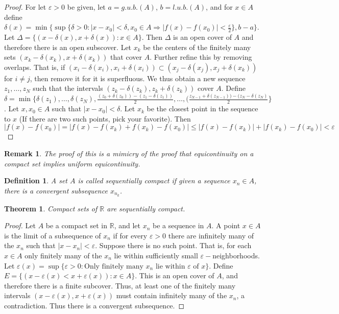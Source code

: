 \documentclass[crop=false,class=book]{standalone}
\theoremstyle{mystyle}
\newtheorem{theorem}{Theorem}[section]
\newtheorem{definition}{Definition}[section]
\newtheorem{remark}{Remark}[section]
\begin{document}
\begin{proof}
For let $\varepsilon>0$ be given, let $a=g.u.b.(A)$, $b=l.u.b.(A)$, and for $x\in A$ define $\delta(x) = \min\{\sup\{\delta>0: |x-x_0|<\delta,x_0\in A\Rightarrow |f(x)-f(x_0)|<\frac{\varepsilon}{2}\},b-a\}$. Let $\Delta = \{(x-\delta(x),x+\delta(x)):x\in A\}$. Then $\Delta$ is an open cover of $A$ and therefore there is an open subscover. Let $x_k$ be the centers of the finitely many sets $(x_k-\delta(x_k),x+\delta(x_k))$ that cover $A$. Further refine this by removing overlaps. That is, if $(x_i-\delta(x_i),x_i+\delta(x_i))\subset (x_j-\delta(x_j),x_j+\delta(x_k))$ for $i\ne j$, then remove it for it is superfluous. We thus obtain a new sequence $z_1,\hdots, z_N$ such that the intervals $(z_k-\delta(z_k),z_k+\delta(z_k))$ cover $A$. Define $\delta = \min\{\delta(z_1),\hdots,\delta(z_N), \frac{(z_0+\delta(z_0))-(z_1-\delta(z_1))}{2},\hdots,(\frac{z_{N-1}+\delta(z_{N-1}))-(z_{N}-\delta(z_{N})}{2}\}$. Let $x,x_0\in A$ such that $|x-x_0|<\delta$. Let $x_k$ be the closest point in the sequence to $x$ (If there are two such points, pick your favorite). Then $|f(x)-f(x_0)|=|f(x)-f(x_k)+f(x_k)-f(x_0)|\leq |f(x)-f(x_k)|+|f(x_k)-f(x_0)|<\varepsilon$
\end{proof}
\begin{remark}
The proof of this is a mimicry of the proof that equicontinuity on a compact set implies uniform equicontinuity.
\end{remark}
\begin{definition}
A set $A$ is called sequentially compact if given a sequence $x_n\in A$, there is a convergent subsequence $x_{n_k}$.
\end{definition}
\begin{theorem}
Compact sets of $\mathbb{R}$ are sequentially compact.
\end{theorem}
\begin{proof}
Let $A$ be a compact set in $\mathbb{R}$, and let $x_n$ be a sequence in $A$. A point $x\in A$ is the limit of a subsequence of $x_n$ if for every $\varepsilon>0$ there are infinitely many of the $x_n$ such that $|x-x_n|<\varepsilon$. Suppose there is no such point. That is, for each $x\in A$ only finitely many of the $x_n$ lie within sufficiently small $\varepsilon-$neighborhoods. Let $\varepsilon(x) = \sup\{\varepsilon>0:\textrm{Only finitely many }x_n \textrm{ lie within } \varepsilon \textrm{ of } x\}$. Define $E=\{(x-\varepsilon(x)<x+\varepsilon(x)):x\in A\}$. This is an open cover of $A$, and therefore there is a finite subcover. Thus, at least one of the finitely many intervals $(x-\varepsilon(x),x+\varepsilon(x))$ must contain infinitely many of the $x_n$, a contradiction. Thus there is a convergent subsequence.
\end{proof}
\end{document}
